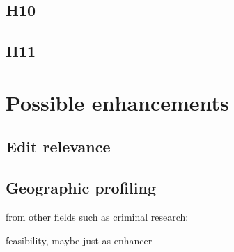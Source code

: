\subsection*{H10}

\subsection*{H11}


\section{Possible enhancements}

\subsection{Edit relevance}


\subsection{Geographic profiling}

\begin{todos}
    \item {}
    \item {}
    \item from other fields such as criminal research: \\ 
    \item feasibility, maybe just as enhancer
\end{todos}
